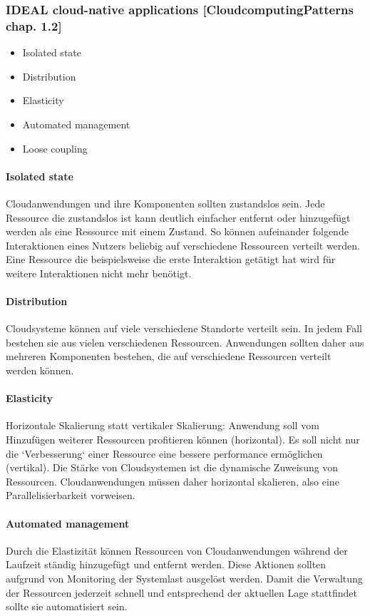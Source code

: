 \documentclass[a4paper,10pt]{article}
\begin{document}
\subsubsection{IDEAL cloud-native applications [CloudcomputingPatterns chap. 1.2]}

\begin{itemize}
 \item Isolated state
 \item Distribution
 \item Elasticity
 \item Automated management
 \item Loose coupling
\end{itemize}

\paragraph{Isolated state}
Cloudanwendungen und ihre Komponenten sollten zustandslos sein.
Jede Ressource die zustandslos ist kann deutlich einfacher entfernt oder hinzugefügt werden als eine Ressource mit einem Zustand.
So können aufeinander folgende Interaktionen eines Nutzers beliebig auf verschiedene Ressourcen verteilt werden.
Eine Ressource die beispielsweise die erste Interaktion getätigt hat wird für weitere Interaktionen nicht mehr benötigt.
\paragraph{Distribution}
Cloudsysteme können auf viele verschiedene Standorte verteilt sein.
In jedem Fall bestehen sie aus vielen verschiedenen Ressourcen.
Anwendungen sollten daher aus mehreren Komponenten bestehen, die auf verschiedene Ressourcen verteilt werden können.
\paragraph{Elasticity}
Horizontale Skalierung statt vertikaler Skalierung:
Anwendung soll vom Hinzufügen weiterer Ressourcen profitieren können (horizontal).
Es soll nicht nur die `Verbesserung` einer Ressource eine bessere performance ermöglichen (vertikal).
Die Stärke von Cloudsystemen ist die dynamische Zuweisung von Ressourcen.
Cloudanwendungen müssen daher horizontal skalieren, also eine Parallelisierbarkeit vorweisen.
\paragraph{Automated management}
Durch die Elastizität können Ressourcen von Cloudanwendungen während der Laufzeit ständig hinzugefügt und entfernt werden.
Diese Aktionen sollten aufgrund von Monitoring der Systemlast ausgelöst werden.
Damit die Verwaltung der Ressourcen jederzeit schnell und entsprechend der aktuellen Lage stattfindet sollte sie automatisiert sein.
\end{document}
